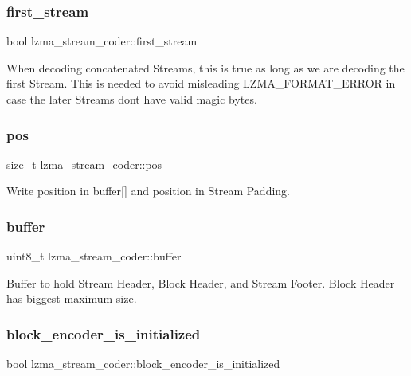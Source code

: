 \subsubsection{first\+\_\+stream}
{\footnotesize\ttfamily bool lzma\+\_\+stream\+\_\+coder\+::first\+\_\+stream}

When decoding concatenated Streams, this is true as long as we are decoding the first Stream. This is needed to avoid misleading L\+Z\+M\+A\+\_\+\+F\+O\+R\+M\+A\+T\+\_\+\+E\+R\+R\+OR in case the later Streams don\textquotesingle{}t have valid magic bytes. \mbox{\label{structlzma__stream__coder_a4e5507b686af8ffd3d1ec58c7ed1cead}} 
\subsubsection{pos}
{\footnotesize\ttfamily size\+\_\+t lzma\+\_\+stream\+\_\+coder\+::pos}



Write position in buffer[] and position in Stream Padding. 

\mbox{\label{structlzma__stream__coder_a010084fc49431f445b009816347f0249}} 
\subsubsection{buffer}
{\footnotesize\ttfamily uint8\+\_\+t lzma\+\_\+stream\+\_\+coder\+::buffer}

Buffer to hold Stream Header, Block Header, and Stream Footer. Block Header has biggest maximum size. \mbox{\label{structlzma__stream__coder_a8b227a172d33c34c47527fec3a55aa85}} 
\subsubsection{block\+\_\+encoder\+\_\+is\+\_\+initialized}
{\footnotesize\ttfamily bool lzma\+\_\+stream\+\_\+coder\+::block\+\_\+encoder\+\_\+is\+\_\+initialized}

